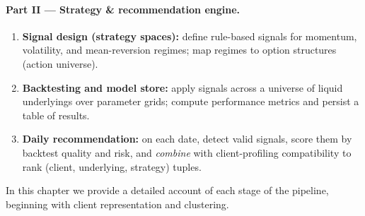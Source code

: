 \documentclass[12pt,a4paper]{report}
\begin{document}
\paragraph{Part II — Strategy \& recommendation engine.}
\begin{enumerate}
    \item \textbf{Signal design (strategy spaces):} define rule-based signals for momentum, volatility, and mean-reversion regimes; map regimes to option structures (action universe).
    \item \textbf{Backtesting and model store:} apply signals across a universe of liquid underlyings over parameter grids; compute performance metrics and persist a table of results.
    \item \textbf{Daily recommendation:} on each date, detect valid signals, score them by backtest quality and risk, and \emph{combine} with client-profiling compatibility to rank (client, underlying, strategy) tuples.
\end{enumerate}

In this chapter we provide a detailed account of each stage of the pipeline, beginning with client representation and clustering.
\end{document}
